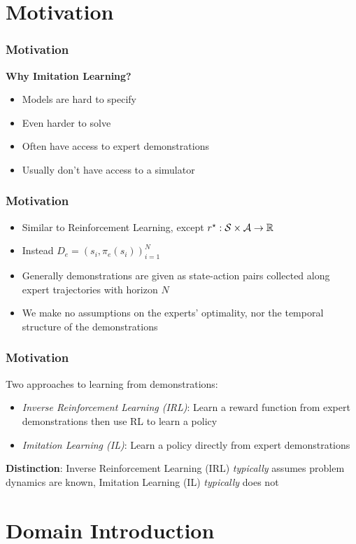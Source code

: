 \documentclass{beamer}
\begin{document}
\section*{Motivation}

\begin{frame}
\frametitle{Motivation}
	\textbf{Why Imitation Learning?}
	\begin{itemize}
		\item Models are hard to specify
		\item Even harder to solve
		\item Often have access to expert demonstrations
		\item Usually don't have access to a simulator
	\end{itemize}
\end{frame}

\begin{frame}
\frametitle{Motivation}
	\begin{itemize}
		\item Similar to Reinforcement Learning, except $r^\star : \mathcal{S} \times \mathcal{A} \to \mathbb{R}$
		\item Instead $D_e = (s_i, \pi_e(s_i))_{i=1}^N$
		\item Generally demonstrations are given as state-action pairs collected along expert trajectories with horizon $N$
		\item We make no assumptions on the experts' optimality, nor the temporal structure of the demonstrations
	\end{itemize}
\end{frame}

\begin{frame}
\frametitle{Motivation}
Two approaches to learning from demonstrations:
\begin{itemize}
	\item \emph{Inverse Reinforcement Learning (IRL)}: Learn a reward function from expert demonstrations then use RL to learn a policy
	\item \emph{Imitation Learning (IL)}: Learn a policy directly from expert demonstrations
\end{itemize}
\textbf{Distinction}: Inverse Reinforcement Learning (IRL) \emph{typically} assumes problem dynamics are known, Imitation Learning (IL) \emph{typically} does not
\end{frame}

\section*{Domain Introduction}
\end{document}
